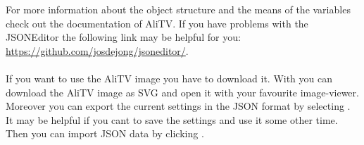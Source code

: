 \documentclass[a4paper]{scrartcl}
\begin{document}
For more information about the object structure and the means of the variables check out the documentation of AliTV. If you have problems with the JSONEditor the following link may be helpful for you: \url{https://github.com/josdejong/jsoneditor/}.

\paragraph*{}
If you want to use the AliTV image you have to download it. With  you can download the AliTV image as SVG and open it with your favourite image-viewer. Moreover you can export the current settings in the JSON format by selecting . It may be helpful if you cant to save the settings and use it some other time. Then you can import JSON data by clicking .
\end{document}
